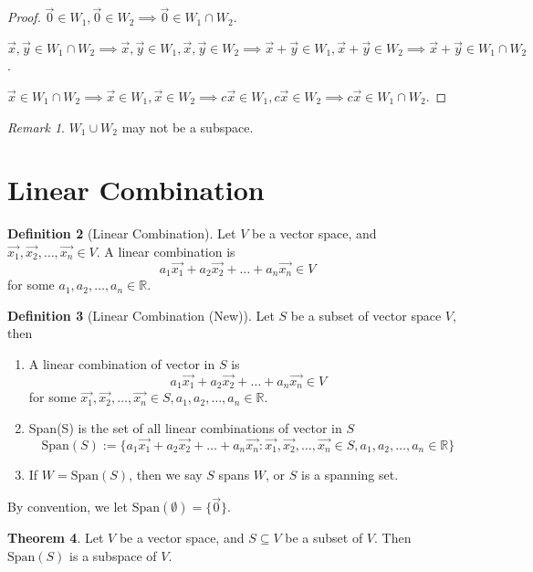 \documentclass{article}
\theoremstyle{definition}
\newtheorem{theorem}{Theorem}[section]
\newtheorem{definition}[theorem]{Definition}
\theoremstyle{remark}
\newtheorem{remark}[theorem]{Remark}
\begin{document}
\begin{proof}
$\vec{0}\in W_1, \vec{0}\in W_2 \implies\vec{0}\in W_1\cap W_2$.

$\vec{x},\vec{y}\in W_1\cap W_2 \implies \vec{x},\vec{y}\in W_1,\vec{x},\vec{y}\in W_2\implies\vec{x}+\vec{y}\in W_1, \vec{x}+\vec{y}\in W_2 \implies\vec{x}+\vec{y}\in W_1\cap W_2$.

$\vec{x}\in W_1\cap W_2 \implies \vec{x}\in W_1,\vec{x}\in W_2\implies c\vec{x}\in W_1,c\vec{x}\in W_2\implies c\vec{x}\in W_1\cap W_2$.
\end{proof}

\begin{remark}
$W_1\cup W_2$ may not be a subspace.
\end{remark}

\section{Linear Combination}
\begin{definition}[Linear Combination]
    Let $V$ be a vector space, and $\vec{x_1},\vec{x_2},\dots,\vec{x_n}\in V$. A linear combination is 
    \[
    a_1\vec{x_1}+a_2\vec{x_2}+\dots +a_n\vec{x_n}\in V
    \]
    for some $a_1,a_2,\dots,a_n\in \mathbb{R}$.
\end{definition}

\begin{definition}[Linear Combination (New)]
    Let $S$ be a subset of vector space $V$, then
    \begin{enumerate}
        \item A linear combination of vector in $S$ is 
        \[
        a_1\vec{x_1}+a_2\vec{x_2}+\dots +a_n\vec{x_n}\in V
        \]
        for some $\vec{x_1},\vec{x_2},\dots,\vec{x_n}\in S,a_1,a_2,\dots,a_n\in \mathbb{R}$.
        \item Span(S) is the set of all linear combinations of vector in $S$
        \[
        \text{Span}(S):=\{a_1\vec{x_1}+a_2\vec{x_2}+\dots +a_n\vec{x_n}:\vec{x_1},\vec{x_2},\dots,\vec{x_n}\in S,a_1,a_2,\dots,a_n\in \mathbb{R}\}
        \]
        \item If $W=\text{Span}(S)$, then we say $S$ spans $W$, or $S$ is a spanning set.
    \end{enumerate}
\end{definition}

By convention, we let $\text{Span}(\emptyset)=\{\vec{0}\}$.

\begin{theorem}
Let $V$ be a vector space, and $S\subseteq V$ be a subset of $V$. Then $\text{Span}(S)$ is a subspace of $V$.
\end{theorem}
\end{document}

